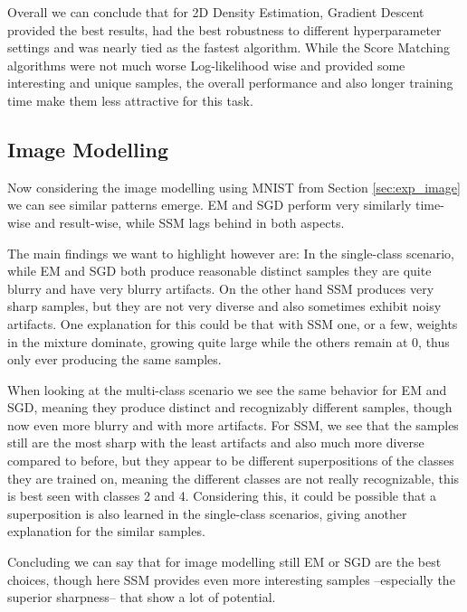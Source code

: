 Overall we can conclude that for 2D Density Estimation, Gradient Descent provided the best results, had the best robustness to 
different hyperparameter settings and was nearly tied as the fastest algorithm. 
While the Score Matching algorithms were not much worse Log-likelihood wise and provided some interesting and unique samples,
the overall performance and also longer training time make them less attractive for this task. \\

\subsection{Image Modelling}

Now considering the image modelling using MNIST from Section \ref{sec:exp_image} 
we can see similar patterns emerge. EM and SGD perform very similarly time-wise and 
result-wise, while SSM lags behind in both aspects.

The main findings we want to highlight however are: In the single-class scenario, while EM and SGD both produce reasonable 
distinct samples they are quite blurry and have very blurry artifacts. On the other 
hand SSM produces very sharp samples, but they are not very diverse and also sometimes exhibit noisy artifacts.
One explanation for this could be that with SSM one, or a few, weights in the mixture dominate, 
growing quite large while the others remain at $0$, thus only ever producing the same samples.

When looking at the multi-class scenario we see the same behavior for EM and SGD, meaning 
they produce distinct and recognizably different samples, though now even more blurry and with more
artifacts. For SSM, we see that the samples still are the most sharp with the least artifacts
and also much more diverse compared to before, but they appear to be different superpositions 
of the classes they are trained on, meaning the different classes are not really 
recognizable, this is best seen with classes 2 and 4.
Considering this, it could be possible that a superposition is also
learned in the single-class scenarios, giving another explanation for the similar samples.

Concluding we can say that for image modelling still EM or SGD are the best choices, 
though here SSM provides even more interesting samples --especially the superior sharpness-- that show a lot of potential.


